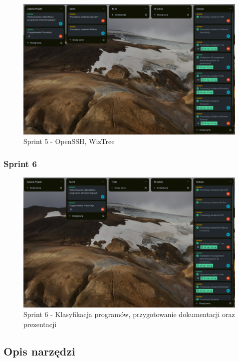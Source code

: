 \documentclass[0.82pt,a4paper]{article}
\begin{document}
    \begin{figure}[H]
        \centering
        \includegraphics[width=0.8\linewidth]{media/Trello_screeny/Sprint6.png}
        \caption[Sprint5]{Sprint 5 - OpenSSH, WizTree}
        \label{fig:sprint5}
    \end{figure}
    
\subsubsection{Sprint 6}

    \begin{figure}[H]
        \centering
        \includegraphics[width=0.8\linewidth]{media/Trello_screeny/Sprint7.PNG}
        \caption[Sprint6]{Sprint 6 - Klasyfikacja programów, przygotowanie dokumentacji oraz prezentacji}
        \label{fig:sprint6}
    \end{figure}

\newpage
\subsection{Opis narzędzi}
\end{document}
